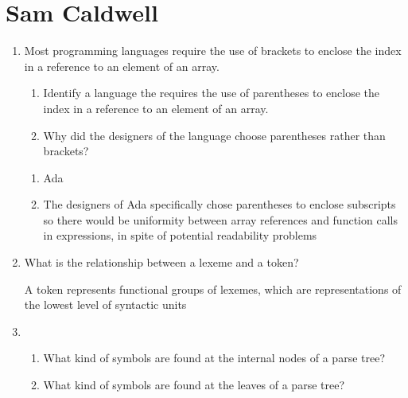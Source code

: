 
\chapter{Sam Caldwell}

\begin{enumerate}
  \item Most programming languages require the use of brackets to
    enclose the index in a reference to an element of an array.
  \begin{enumerate}
    \item Identify a language the requires the use of parentheses
      to enclose the index in a reference to an element of an array.
    \item Why did the designers of the language choose parentheses
      rather than brackets?
    \end{enumerate}

  \begin{answer}

  \begin{enumerate}
    \item Ada
    \item The designers of Ada specifically chose parentheses to
      enclose subscripts so there would be uniformity between array
      references and function calls in expressions, in spite of
      potential readability problems
    \end{enumerate}

    \end{answer}
    
  \item What is the relationship between a lexeme and a token?

  \begin{answer}

    A token represents functional groups of lexemes, which are
    representations of the lowest level of syntactic units

    \end{answer}

  \item
  \begin{enumerate}
    \item What kind of symbols are found at the internal nodes of a
      parse tree?
    \item What kind of symbols are found at the leaves of a parse tree?
    \end{enumerate}

  \begin{answer}


\end{answer}
\end{enumerate}
